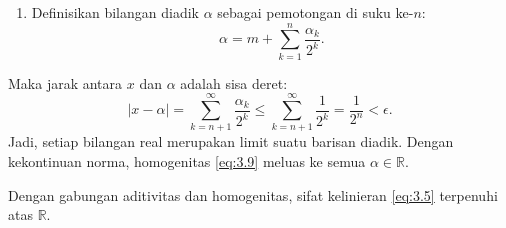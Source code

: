 \documentclass[aspectratio=169,11pt]{beamer}
\theoremstyle{definition}
\newcommand{\R}{\mathbb{R}}
\begin{document}
\begin{frame}[allowframebreaks]{\insertsection}{\insertsubsection}
\begin{itemize}
\begin{enumerate}
\begin{enumerate}
                          Jika $r_{k-1} < \frac{1}{2^k}$, maka $\alpha_k = 0$ dan $r_k = r_{k-1} \in \left[0, \frac{1}{2^k}\right)$. Pada kedua kasus, $r_k \in \left[0, \frac{1}{2^k}\right)$, sehingga $r_k \to 0$ untuk $k \to \infty$. Karena $r_0 = \sum_{j=1}^{k} \frac{\alpha_j}{2^j} + r_k$ untuk setiap $k$, maka:
                          \begin{equation*}
                            x - m = r_0 = \lim_{k \to \infty} \sum_{j=1}^{k} \frac{\alpha_j}{2^j} = \sum_{k=1}^{\infty} \frac{\alpha_k}{2^k}, \quad \alpha_k \in \{0,1\}.
                          \end{equation*}
                    \item Definisikan bilangan diadik $\alpha$ sebagai pemotongan di suku ke-$n$:
                          \begin{equation*}
                            \alpha = m + \sum_{k=1}^n \frac{\alpha_k}{2^k}.
                          \end{equation*}
                  \end{enumerate}

                  Maka jarak antara $x$ dan $\alpha$ adalah sisa deret:
                  \begin{equation*}
                    |x - \alpha| = \sum_{k=n+1}^{\infty} \frac{\alpha_k}{2^k} \leq \sum_{k=n+1}^{\infty} \frac{1}{2^k} = \frac{1}{2^n} < \epsilon.
                  \end{equation*}
                  Jadi, setiap bilangan real merupakan limit suatu barisan diadik. Dengan kekontinuan norma, homogenitas \eqref{eq:3.9} meluas ke semua $\alpha \in \R$.
          \end{enumerate}
  \end{itemize}
  Dengan gabungan aditivitas dan homogenitas, sifat kelinieran \eqref{eq:3.5} terpenuhi atas $\R$.
\end{frame}
\end{document}
